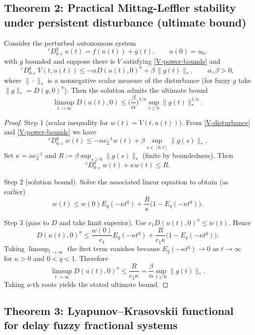 \documentclass[11pt,a4paper]{article}
\theoremstyle{plain}
\theoremstyle{definition}
\theoremstyle{remark}
\newcommand{\Haus}{D}
\begin{document}
	\subsection{Theorem 2: Practical Mittag-Leffler stability under persistent disturbance (ultimate bound)}
	
	Consider the perturbed autonomous system
	\[
	{}^cD_{0+}^q u(t)=f(u(t))+g(t),\qquad u(0)=u_0,
	\]
	with \(g\) bounded and suppose there is \(V\) satisfying \eqref{V-power-bounds} and
	\begin{equation}\label{V-disturbance}
		{}^cD_{0+}^q V(t,u(t)) \le -\alpha \Haus(u(t),0)^a + \beta \,\|g(t)\|_*,\qquad \alpha,\beta>0,
	\end{equation}
	where \(\|\cdot\|_*\) is a nonnegative scalar measure of the disturbance (for fuzzy \(g\) take \(\|g\|_*=\Haus(g,0)^a\)). Then the solution admits the ultimate bound
	\[
	\limsup_{t\to\infty}\Haus(u(t),0)\le \Big(\frac{\beta}{\alpha}\Big)^{1/a}\sup_{t\ge0}\|g(t)\|_*^{1/a}.
	\]
	
	\begin{proof}
		Step 1 (scalar inequality for \(w(t)=V(t,u(t))\)). From \eqref{V-disturbance} and \eqref{V-power-bounds} we have
		\[
		{}^cD_{0+}^q w(t) \le -\alpha c_2^{-1} w(t) + \beta \sup_{s\in[0,t]}\|g(s)\|_*.
		\]
		Set \(\kappa=\alpha c_2^{-1}\) and \(R:=\beta \sup_{s\ge0}\|g(s)\|_*\) (finite by boundedness). Then
		\[
		{}^cD_{0+}^q w(t) + \kappa w(t) \le R.
		\]
		
		Step 2 (solution bound). Solve the associated linear equation to obtain (as earlier)
		\[
		w(t)\le w(0)E_q(-\kappa t^q) + \frac{R}{\kappa}\big(1-E_q(-\kappa t^q)\big).
		\]
		
		Step 3 (pass to \(\Haus\) and take limit superior). Use \(c_1\Haus(u(t),0)^a\le w(t)\). Hence
		\[
		\Haus(u(t),0)^a \le \frac{w(0)}{c_1}E_q(-\kappa t^q) + \frac{R}{c_1\kappa}\big(1-E_q(-\kappa t^q)\big).
		\]
		Taking \(\limsup_{t\to\infty}\) the first term vanishes because \(E_q(-\kappa t^q)\to0\) as \(t\to\infty\) for \(\kappa>0\) and \(0<q<1\). Therefore
		\[
		\limsup_{t\to\infty}\Haus(u(t),0)^a \le \frac{R}{c_1\kappa} = \frac{\beta}{\alpha}\sup_{t\ge0}\|g(t)\|_*.
		\]
		Taking \(a\)-th roots yields the stated ultimate bound.
	\end{proof}
	
	\subsection{Theorem 3: Lyapunov--Krasovskii functional for delay fuzzy fractional systems}
	
\end{document}
